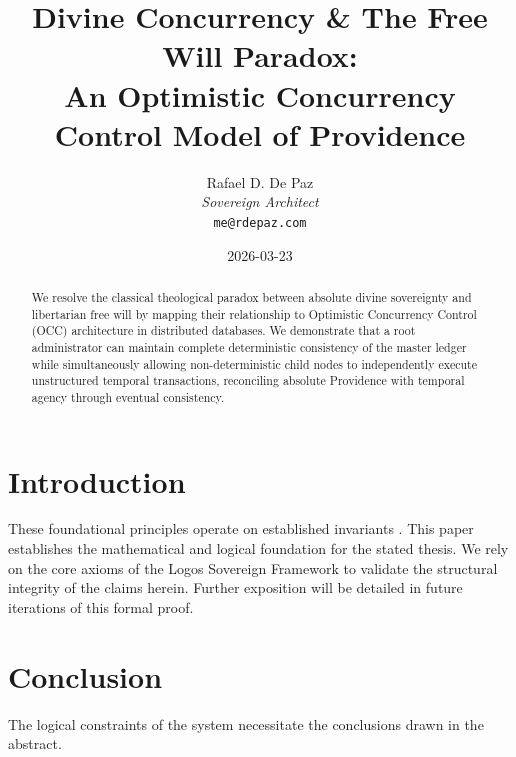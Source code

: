 \documentclass[12pt, a4paper]{article}
\theoremstyle{plain}
\theoremstyle{definition}
\begin{document}
\title{\textbf{
  Divine Concurrency \& The Free Will Paradox: \\ An Optimistic Concurrency Control Model of Providence}}
\author{Rafael D. De Paz \\ \textit{Sovereign Architect} \\ \texttt{me@rdepaz.com}}
\date{2026-03-23}
\maketitle

\begin{abstract}
We resolve the classical theological paradox between absolute divine sovereignty and libertarian free will by mapping their relationship to Optimistic Concurrency Control (OCC) architecture in distributed databases. We demonstrate that a root administrator can maintain complete deterministic consistency of the master ledger while simultaneously allowing non-deterministic child nodes to independently execute unstructured temporal transactions, reconciling absolute Providence with temporal agency through eventual consistency.
\end{abstract}

\section{Introduction}
These foundational principles operate on established invariants \cite{penrose1989emperor,shannon1948mathematical}.
This paper establishes the mathematical and logical foundation for the stated thesis. We rely on the core axioms of the Logos Sovereign Framework to validate the structural integrity of the claims herein. Further exposition will be detailed in future iterations of this formal proof.

\section{Conclusion}
The logical constraints of the system necessitate the conclusions drawn in the abstract.





\vspace{3em}
\noindent\hrulefill
\vspace{1em}
\end{document}

